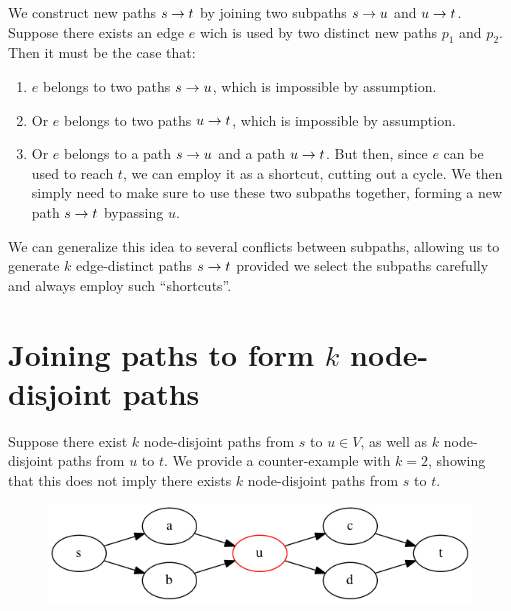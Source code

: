 We construct new paths $s \rightarrow t$ by joining two subpaths $s \rightarrow u$ and $u \rightarrow t$. Suppose there exists an edge $e$ wich is used by two distinct new paths $p_1$ and $p_2$. Then it must be the case that:

\begin{enumerate}
  \item $e$ belongs to two paths $s \rightarrow u$, which is impossible by assumption.
  \item Or $e$ belongs to two paths $u \rightarrow t$, which is impossible by assumption.
  \item Or $e$ belongs to a path $s \rightarrow u$ and a path $u \rightarrow t$. But then, since $e$ can be used to reach $t$, we can employ it as a shortcut, cutting out a cycle. We then simply need to make sure to use these two subpaths together, forming a new path $s \rightarrow t$ bypassing $u$.
\end{enumerate}

We can generalize this idea to several conflicts between subpaths, allowing us to generate $k$ edge-distinct paths $s \rightarrow t$ provided we select the subpaths carefully and always employ such ``shortcuts''.

\section{Joining paths to form $k$ \textbf{node}-disjoint paths}
Suppose there exist $k$ node-disjoint paths from $s$ to $u \in V$, as well as $k$ node-disjoint paths from $u$ to $t$. We provide a counter-example with $k = 2$, showing that this does not imply there exists $k$ node-disjoint paths from $s$ to $t$.

\begin{figure}[ht]
  \center
  \includegraphics[width=12cm]{figures/3-4-graph.png}
\end{figure}
